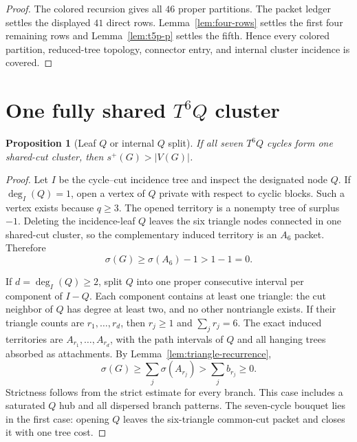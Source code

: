 \documentclass[11pt]{article}
\newtheorem{proposition}[theorem]{Proposition}
\newcommand{\spE}{s^+}
\newcommand{\sig}{\sigma}
\begin{document}
\begin{proof}
The colored recursion gives all $46$ proper partitions.  The packet ledger
settles the displayed $41$ direct rows.  Lemma~\ref{lem:four-rows} settles the
first four remaining rows and Lemma~\ref{lem:t5p-p} settles the fifth.  Hence
every colored partition, reduced-tree topology, connector entry, and internal
cluster incidence is covered.
\end{proof}

\section{One fully shared $T^6Q$ cluster}

\begin{proposition}[Leaf $Q$ or internal $Q$ split]\label{prop:shared-t6q}
If all seven $T^6Q$ cycles form one shared-cut cluster, then
$\spE(G)>|V(G)|$.
\end{proposition}

\begin{proof}
Let $I$ be the cycle--cut incidence tree and inspect the designated node $Q$.
If $\deg_I(Q)=1$, open a vertex of $Q$ private with respect to cyclic blocks.
Such a vertex exists because $q\geq3$.  The opened territory is a nonempty
tree of surplus $-1$.  Deleting the incidence-leaf $Q$ leaves the six triangle
nodes connected in one shared-cut cluster, so the complementary induced
territory is an $A_6$ packet.  Therefore
\[
 \sig(G)\geq\sig(A_6)-1>1-1=0.
\]

If $d=\deg_I(Q)\geq2$, split $Q$ into one proper consecutive interval per
component of $I-Q$.  Each component contains at least one triangle: the cut
neighbor of $Q$ has degree at least two, and no other nontriangle exists.  If
their triangle counts are $r_1,\ldots,r_d$, then $r_j\geq1$ and
$\sum_jr_j=6$.  The exact induced territories are $A_{r_1},\ldots,A_{r_d}$,
with the path intervals of $Q$ and all hanging trees absorbed as attachments.
By Lemma~\ref{lem:triangle-recurrence},
\[
 \sig(G)\geq\sum_j\sig(A_{r_j})>\sum_j b_{r_j}\geq0.
\]
Strictness follows from the strict estimate for every branch.  This case
includes a saturated $Q$ hub and all dispersed branch patterns.  The
seven-cycle bouquet lies in the first case: opening $Q$ leaves the six-triangle
common-cut packet and closes it with one tree cost.
\end{proof}
\end{document}
